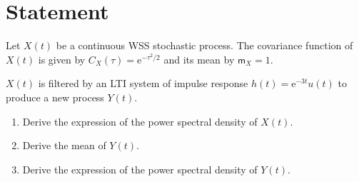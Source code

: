 \documentclass[11pt]{article}
\newcommand{\e}{\mathrm{e}}
\newcommand{\momnc}{\mathsf{m}}
\newcommand{\cov}{C}
\begin{document}
\section{Statement}
Let $X(t)$ be a continuous WSS stochastic process.
The covariance function of $X(t)$ is given by $\cov_X(\tau) = \e^{-\tau^2/2}$ and its mean by $\momnc_X = 1$.

$X(t)$ is filtered by an LTI system of impulse response $h(t) = \e^{-3t} u(t)$ to produce a new process $Y(t)$.

\begin{enumerate}
	\item Derive the expression of the power spectral density of $X(t)$.
	\item Derive the mean of $Y(t)$.
	\item Derive the expression of the power spectral density of $Y(t)$.
\end{enumerate}
\end{document}
